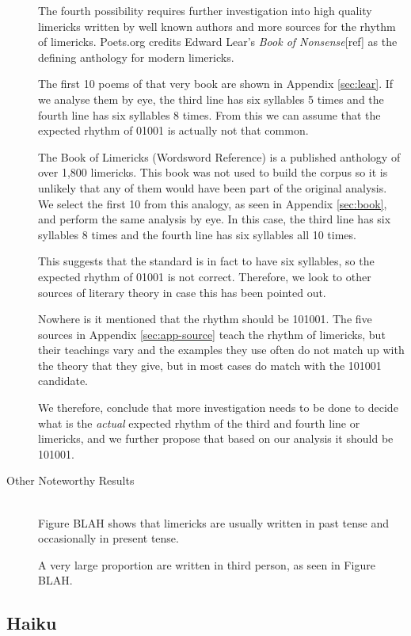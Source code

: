 \begin{description}
The fourth possibility requires further investigation into high quality limericks written by well known authors and more sources for the rhythm of limericks. Poets.org credits Edward Lear's \textit{Book of Nonsense}[ref] as the defining anthology for modern limericks.

The first 10 poems of that very book are shown in Appendix \ref{sec:lear}. If we analyse them by eye, the third line has six syllables 5 times and the fourth line has six syllables 8 times. From this we can assume that the expected rhythm of 01001 is actually not that common.

The Book of Limericks (Wordsword Reference) is a published anthology of over 1,800 limericks. This book was not used to build the corpus so it is unlikely that any of them would have been part of the original analysis. We select the first 10 from this analogy, as seen in Appendix \ref{sec:book}, and perform the same analysis by eye. In this case, the third line has six syllables 8 times and the fourth line has six syllables all 10 times.

This suggests that the standard is in fact to have six syllables, so the expected rhythm of 01001 is not correct. Therefore, we look to other sources of literary theory in case this has been pointed out.

Nowhere is it mentioned that the rhythm should be 101001. The five sources in Appendix \ref{sec:app-source} teach the rhythm of limericks, but their teachings vary and the examples they use often do not match up with the theory that they give, but in most cases do match with the 101001 candidate.

We therefore, conclude that more investigation needs to be done to decide what is the \textit{actual} expected rhythm of the third and fourth line or limericks, and we further propose that based on our analysis it should be 101001.

\item[Other Noteworthy Results]  \hfill \\
Figure BLAH shows that limericks are usually written in past tense and occasionally in present tense.

A very large proportion are written in third person, as seen in Figure BLAH.

\end{description}


\subsection{Haiku}

